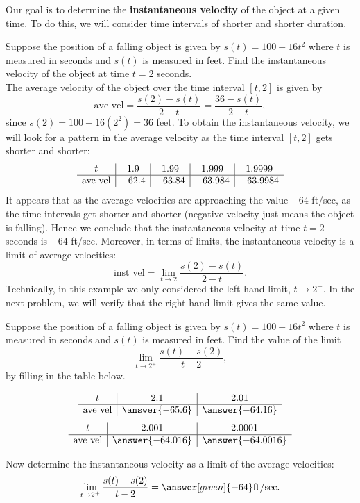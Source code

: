 \documentclass{ximera}
\begin{document}
Our goal is to determine the \textbf{instantaneous velocity} of the 
object at a given time.  To do this, we will consider time intervals of shorter and shorter duration.


\begin{example}[example 11]
Suppose the position of a falling object is given by $s(t) = 100-16t^2$ where $t$ is measured in seconds and $s(t)$ is measured in feet.
Find the instantaneous velocity of the object at time $t = 2$ seconds.\\
The average velocity of the object over the time interval $[t,2]$ is given by 
\[
\text{ave vel} = \frac{s(2)-s(t)}{2-t} = \frac{36-s(t)}{2-t},
\]
since $s(2) = 100 - 16(2^2) = 36$ feet.
To obtain the instantaneous velocity, we will look for a pattern in the average velocity as the time interval $[t, 2]$ gets shorter and shorter:
\[
\begin{array}{ c | c | c | c | c }
 t & 1.9 & 1.99  & 1.999 & 1.9999 \\ 
	\hline 
	 \text{ave vel} & -62.4 & -63.84 & -63.984 & -63.9984
\end{array}
\]  
It appears that as the average velocities are approaching the value $-64$ ft/sec, as the time intervals 
get shorter and shorter (negative velocity just means the object is falling).  Hence we conclude that the instantaneous velocity at time $t = 2$ seconds is $-64$ ft/sec.
Moreover, in terms of limits, the instantaneous velocity is a limit of average velocities:
\[\text{inst vel} = \lim_{t\to 2} \frac{s(2) - s(t)}{2-t}.\]
Technically, in this example we only considered the left hand limit, $t\to 2^-$.
In the next problem, we will verify that the right hand limit gives the same value. 
\end{example}

\begin{problem}[problem 13]
Suppose the position of a falling object is given by $s(t) = 100-16t^2$ where $t$ is measured in seconds and $s(t)$ is measured in feet.
Find the value of the limit
\[
\lim_{t\to 2^+} \frac{s(t) - s(2)}{t-2},
\]
by filling in the table below.

\begin{prompt}
\begin{center}
\[
\begin{array}{ c | c | c }
  t & 2.1 & 2.01   \\ 
	\hline 
	 \text{ave vel} & \answer{-65.6} & \answer{-64.16} 
\end{array}
\]
\[
\begin{array}{ c | c | c  }
  t  & 2.001 & 2.0001 \\ 
	\hline 
	 \text{ave vel} & \answer{-64.016} & \answer{-64.0016}
\end{array}
\]
\end{center}
Now determine the instantaneous velocity as a limit of the average velocities:
\[
\lim_{t\to 2^+} \frac{s(t) - s(2)}{t-2} = \answer[given]{-64} \text{ft/sec}.
\]
\end{prompt}



\end{problem}


\begin{center}
\begin{foldable}
\end{foldable}
\end{center}
\end{document}
